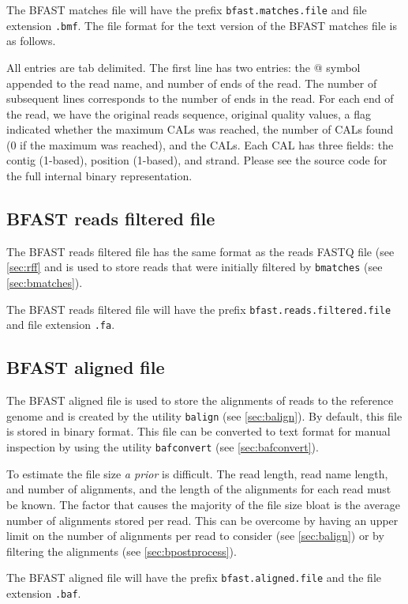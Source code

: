 \documentclass[a4paper,12pt]{book}
\newcommand{\TT}[1]{{\tt #1}} %
\newcommand{\IF}[1]{{\it #1}} %
\newcommand{\rFF}{reads FASTQ file}
\newcommand{\BMF}{BFAST matches file} %
\newcommand{\BRFF}{BFAST reads filtered file} %
\newcommand{\BAF}{BFAST aligned file} %
\begin{document}
The \BMF{} will have the prefix \TT{bfast.matches.file} and file extension \TT{.bmf}.
The file format for the text version of the \BMF{} is as follows.

All entries are tab delimited.
The first line has two entries: the @ symbol appended to the read name, and number of ends of the read.
The number of subsequent lines corresponds to the number of ends in the read.
For each end of the read, we have the original reads sequence, original quality values, a flag indicated whether the maximum CALs was reached, the number of CALs found (0 if the maximum was reached), and the CALs.
Each CAL has three fields: the contig (1-based), position (1-based), and strand.
Please see the source code for the full internal binary representation.

\subsection{\BRFF{}}
\label{sec:brff}
The \BRFF{} has the same format as the \rFF{} (see \autoref{sec:rff} and is used to store reads that were initially filtered by \TT{bmatches} (see \autoref{sec:bmatches}).

The \BRFF{} will have the prefix \TT{bfast.reads.filtered.file} and file extension \TT{.fa}.

\subsection{\BAF{}}
\label{sec:baf} 
The \BAF{} is used to store the alignments of reads to the reference genome and is created by the utility \TT{balign} (see \autoref{sec:balign}).
By default, this file is stored in binary format.
This file can be converted to text format for manual inspection by using the utility \TT{bafconvert} (see \autoref{sec:bafconvert}).

To estimate the file size \IF{a prior} is difficult.
The read length, read name length, and number of alignments, and the length of the alignments for each read must be known.
The factor that causes the majority of the file size bloat is the average number of alignments stored per read.
This can be overcome by having an upper limit on the number of alignments per read to consider (see \autoref{sec:balign}) or by filtering the alignments (see \autoref{sec:bpostprocess}).

The \BAF{} will have the prefix \TT{bfast.aligned.file} and the file extension \TT{.baf}.
\end{document}
